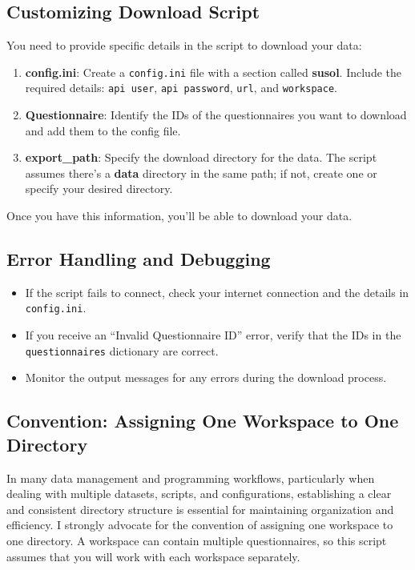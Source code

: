 \documentclass[
  letterpaper,
  DIV=11,
  numbers=noendperiod]{scrreprt}
\begin{document}
\subsection{Customizing Download
Script}\label{customizing-download-script}

You need to provide specific details in the script to download your
data:

\begin{enumerate}
\def\labelenumi{\arabic{enumi}.}
\item
  \textbf{config.ini}: Create a \texttt{config.ini} file with a section
  called \textbf{susol}. Include the required details:
  \texttt{api\ user}, \texttt{api\ password}, \texttt{url}, and
  \texttt{workspace}.
\item
  \textbf{Questionnaire}: Identify the IDs of the questionnaires you
  want to download and add them to the config file.
\item
  \textbf{export\_path}: Specify the download directory for the data.
  The script assumes there's a \textbf{data} directory in the same path;
  if not, create one or specify your desired directory.
\end{enumerate}

Once you have this information, you'll be able to download your data.

\subsection{Error Handling and
Debugging}\label{error-handling-and-debugging}

\begin{itemize}
\item
  If the script fails to connect, check your internet connection and the
  details in \texttt{config.ini}.
\item
  If you receive an ``Invalid Questionnaire ID'' error, verify that the
  IDs in the \texttt{questionnaires} dictionary are correct.
\item
  Monitor the output messages for any errors during the download
  process.
\end{itemize}

\subsection{Convention: Assigning One Workspace to One
Directory}\label{convention-assigning-one-workspace-to-one-directory}

In many data management and programming workflows, particularly when
dealing with multiple datasets, scripts, and configurations,
establishing a clear and consistent directory structure is essential for
maintaining organization and efficiency. I strongly advocate for the
convention of assigning one workspace to one directory. A workspace can
contain multiple questionnaires, so this script assumes that you will
work with each workspace separately.
\end{document}
